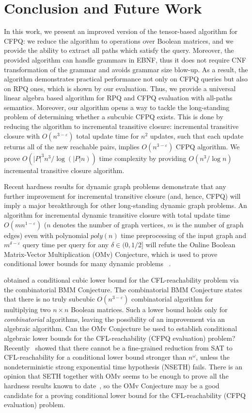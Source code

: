 \section{Conclusion and Future Work}

In this work, we present an improved version of the tensor-based algorithm for CFPQ: we reduce the algorithm to operations over Boolean matrices, and we provide the ability to extract all paths which satisfy the query.
Moreover, the provided algorithm can handle grammars in EBNF, thus it does not require CNF transformation of the grammar and avoids grammar size blow-up.
As a result, the algorithm demonstrates practical performance not only on CFPQ queries but also on RPQ ones, which is shown by our evaluation.
Thus, we provide a universal linear algebra based algorithm for RPQ and CFPQ evaluation with all-paths semantics.
Moreover, our algorithm opens a way to tackle the long-standing problem of determining whether a subcubic CFPQ exists.
This is done by reducing the algorithm to incremental transitive closure: incremental transitive closure with $O(n^{3-\varepsilon})$ total update time for $n^2$ updates, such that each update returns all of the new reachable pairs, implies $O(n^{3-\varepsilon})$ CFPQ algorithm.
We prove $O({|P|}^3n^3/\log (|P|n))$ time complexity by providing $O(n^3/\log{n})$ incremental transitive closure algorithm.


Recent hardness results for dynamic graph problems demonstrate that any further improvement for incremental transitive closure (and, hence, CFPQ) will imply a major breakthrough for other long-standing dynamic graph problems. An algorithm for incremental dynamic transitive closure with total update time $O(mn^{1-\varepsilon})$ ($n$ denotes the number of graph vertices, $m$ is the number of graph edges) even with polynomial $poly(n)$ time preprocessing of the input graph and $m^{\delta - \varepsilon}$ query time per query for any $\delta \in (0, 1/2]$ will refute the Online Boolean Matrix-Vector Multiplication (OMv) Conjecture, which is used to prove conditional lower bounds for many dynamic problems ~\citep{8948597, 10.1145/2746539.2746609}.


\cite{10.1145/3158118} obtained a conditional cubic lower bound for the CFL-reachability problem via the combinatorial BMM Conjecture. The combinatorial BMM Conjecture states that there is no truly subcubic $O(n^{3-\varepsilon})$ combinatorial algorithm for multiplying two $n \times n$ Boolean matrices. Such a lower bound holds only for \textit{combinatorial} algorithms, leaving the possibility of an improvement via
an algebraic algorithm. Can the OMv Conjecture be used to establish conditional algebraic lower bounds for the CFL-reachability (CFPQ evaluation) problem? Recently~\cite{chistikov2021subcubic} showed that there cannot be a fine-grained reduction from SAT to CFL-reachability for a conditional lower bound stronger than $n^{\omega}$, unless the nondeterministic strong exponential time hypothesis (NSETH) fails. There is an opinion that SETH together with OMv seems to be enough to prove all the
hardness results known to date~\citep{10.1145/2746539.2746609}, so the OMv Conjecture may be a good candidate for a proving conditional lower bound for the CFL-reachability (CFPQ evaluation) problem.


